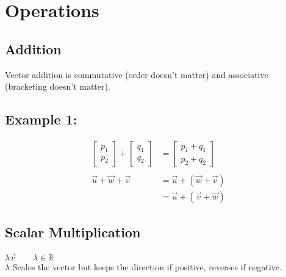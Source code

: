 \documentclass[class=article, crop=false]{standalone}
\begin{document}
\section*{Operations}
\subsection*{Addition}
Vector addition is commutative (order doesn't matter) and associative (bracketing doesn't matter).
\subsection*{Example 1:}
\begin{align*}
\begin{bmatrix} p_1 \\ p_2 \end{bmatrix} + 
\begin{bmatrix} q_1 \\ q_2 \end{bmatrix} &= 
\begin{bmatrix} p_1 + q_1 \\ p_2 + q_2 \end{bmatrix} \\\\
\vec{u} + \vec{w} + \vec{v} & = \vec{u} + ( \vec{w} + \vec{v} ) \\
		  & = \vec{u} + ( \vec{v} + \vec{w} )
\end{align*}
\subsection*{Scalar Multiplication}
$ \lambda \vec{v} \qquad \lambda \in \mathbb{R}$\\
$\lambda$ Scales the vector but keeps the direction if positive, reverses if negative.\\
\end{document}
